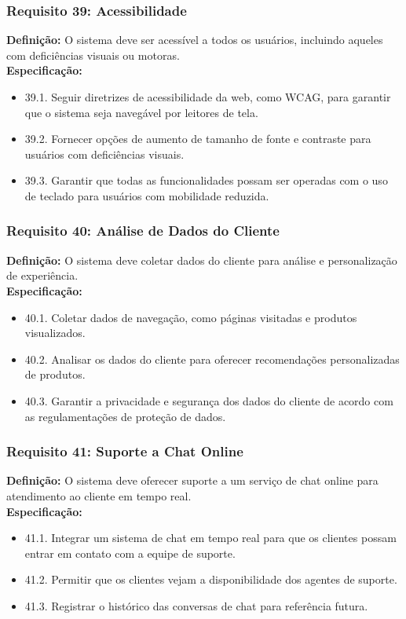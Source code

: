 \subsubsection{Requisito 39: Acessibilidade}
\textbf{Definição:} O sistema deve ser acessível a todos os usuários, incluindo aqueles com deficiências visuais ou motoras.
\\
\textbf{Especificação:}
\begin{itemize}
	\item 39.1. Seguir diretrizes de acessibilidade da web, como WCAG, para garantir que o sistema seja navegável por leitores de tela.
	\item 39.2. Fornecer opções de aumento de tamanho de fonte e contraste para usuários com deficiências visuais.
	\item 39.3. Garantir que todas as funcionalidades possam ser operadas com o uso de teclado para usuários com mobilidade reduzida.
\end{itemize}

\subsubsection{Requisito 40: Análise de Dados do Cliente}
\textbf{Definição:} O sistema deve coletar dados do cliente para análise e personalização de experiência.
\\
\textbf{Especificação:}
\begin{itemize}
	\item 40.1. Coletar dados de navegação, como páginas visitadas e produtos visualizados.
	\item 40.2. Analisar os dados do cliente para oferecer recomendações personalizadas de produtos.
	\item 40.3. Garantir a privacidade e segurança dos dados do cliente de acordo com as regulamentações de proteção de dados.
\end{itemize}

\subsubsection{Requisito 41: Suporte a Chat Online}
\textbf{Definição:} O sistema deve oferecer suporte a um serviço de chat online para atendimento ao cliente em tempo real.
\\
\textbf{Especificação:}
\begin{itemize}
	\item 41.1. Integrar um sistema de chat em tempo real para que os clientes possam entrar em contato com a equipe de suporte.
	\item 41.2. Permitir que os clientes vejam a disponibilidade dos agentes de suporte.
	\item 41.3. Registrar o histórico das conversas de chat para referência futura.
\end{itemize}

